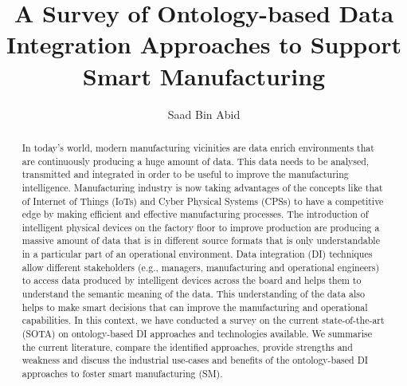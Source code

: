 \documentclass{llncs}
\begin{document}
%
\frontmatter          %

\mainmatter              %
%
\title{A Survey of Ontology-based Data Integration Approaches to Support Smart Manufacturing}
%
\titlerunning{}  %
%
\author{Saad Bin Abid}
%
\authorrunning{} %
%
\tocauthor{}
%
\maketitle              %
\vspace{-.5cm}
\begin{abstract}
In today’s world, modern manufacturing vicinities are data enrich environments that are continuously producing a huge amount of data.
This data needs to be analysed, transmitted and integrated in order to be useful to improve the manufacturing intelligence.
Manufacturing industry is now taking advantages of the concepts like that of Internet of Things (IoTs) and Cyber Physical Systems (CPSs) to have a competitive edge by making efficient and effective manufacturing processes. 
The introduction of intelligent physical devices on the factory floor to improve production are producing a massive amount of data that is in different source formats that is only understandable in a particular part of an operational environment. 
Data integration (DI) techniques allow different stakeholders (e.g., managers, manufacturing and operational engineers) to access data produced by intelligent devices across the board and helps them to understand the semantic meaning of the data. 
This understanding of the data also helps to make smart decisions that can improve the manufacturing and operational capabilities. 
In this context, we have conducted a survey on the current state-of-the-art
(SOTA) on ontology-based DI approaches and technologies available. We summarise the current literature, compare the identified approaches, provide strengths and weakness and discuss the industrial use-cases and benefits of the ontology-based DI approaches to foster smart manufacturing (SM).
\end{abstract}

 
 
 



\end{document}
